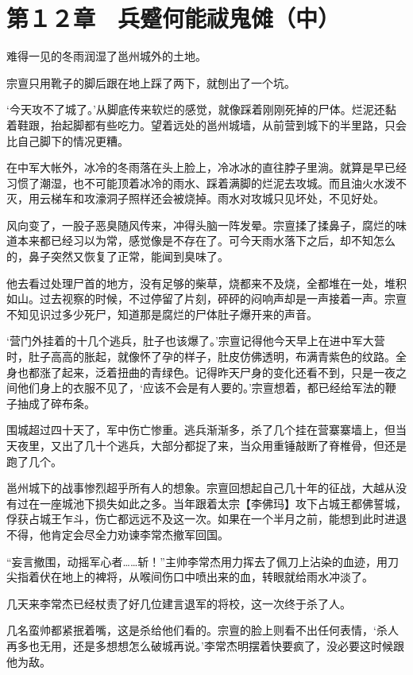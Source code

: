 \section{第１２章　兵蹙何能祓鬼傩（中）}

难得一见的冬雨润湿了邕州城外的土地。

宗亶只用靴子的脚后跟在地上踩了两下，就刨出了一个坑。

‘今天攻不了城了。’从脚底传来软烂的感觉，就像踩着刚刚死掉的尸体。烂泥还黏着鞋跟，抬起脚都有些吃力。望着远处的邕州城墙，从前营到城下的半里路，只会比自己脚下的情况更糟。

在中军大帐外，冰冷的冬雨落在头上脸上，冷冰冰的直往脖子里淌。就算是早已经习惯了潮湿，也不可能顶着冰冷的雨水、踩着满脚的烂泥去攻城。而且油火水泼不灭，用云梯车和攻濠洞子照样还会被烧掉。雨水对攻城只见坏处，不见好处。

风向变了，一股子恶臭随风传来，冲得头脑一阵发晕。宗亶揉了揉鼻子，腐烂的味道本来都已经习以为常，感觉像是不存在了。可今天雨水落下之后，却不知怎么的，鼻子突然又恢复了正常，能闻到臭味了。

他去看过处理尸首的地方，没有足够的柴草，烧都来不及烧，全都堆在一处，堆积如山。过去视察的时候，不过停留了片刻，砰砰的闷响声却是一声接着一声。宗亶不知见识过多少死尸，知道那是腐烂的尸体肚子爆开来的声音。

‘营门外挂着的十几个逃兵，肚子也该爆了。’宗亶记得他今天早上在进中军大营时，肚子高高的胀起，就像怀了孕的样子，肚皮仿佛透明，布满青紫色的纹路。全身也都涨了起来，泛着扭曲的青绿色。记得昨天尸身的变化还看不到，只是一夜之间他们身上的衣服不见了，‘应该不会是有人要的。’宗亶想着，都已经给军法的鞭子抽成了碎布条。

围城超过四十天了，军中伤亡惨重。逃兵渐渐多，杀了几个挂在营寨寨墙上，但当天夜里，又出了几十个逃兵，大部分都捉了来，当众用重锤敲断了脊椎骨，但还是跑了几个。

邕州城下的战事惨烈超乎所有人的想象。宗亶回想起自己几十年的征战，大越从没有过在一座城池下损失如此之多。当年跟着太宗【李佛玛】攻下占城王都佛誓城，俘获占城王乍斗，伤亡都远远不及这一次。如果在一个半月之前，能想到此时进退不得，他肯定会尽全力劝谏李常杰撤军回国。

“妄言撤围，动摇军心者……斩！”主帅李常杰用力挥去了佩刀上沾染的血迹，用刀尖指着伏在地上的裨将，从喉间伤口中喷出来的血，转眼就给雨水冲淡了。

几天来李常杰已经杖责了好几位建言退军的将校，这一次终于杀了人。

几名蛮帅都紧抿着嘴，这是杀给他们看的。宗亶的脸上则看不出任何表情，‘杀人再多也无用，还是多想想怎么破城再说。’李常杰明摆着快要疯了，没必要这时候跟他为敌。

